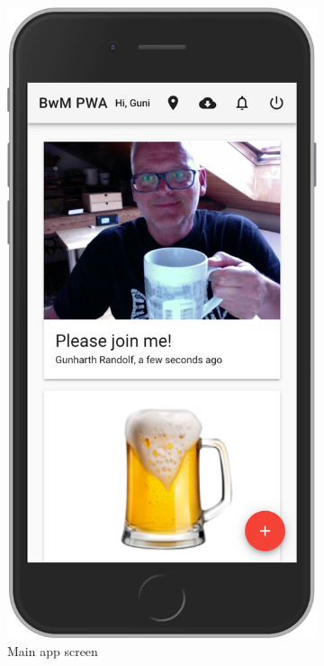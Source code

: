 \begin{figure}
\begin{subfigure}{.5\textwidth}
    \includegraphics[width=.7\linewidth]{img/screen02}
    \caption{Main app screen}
    \label{fig:sub2}
  \end{subfigure}
  \begin{subfigure}{.5\textwidth}
    \centering

\end{subfigure}
\end{figure}
